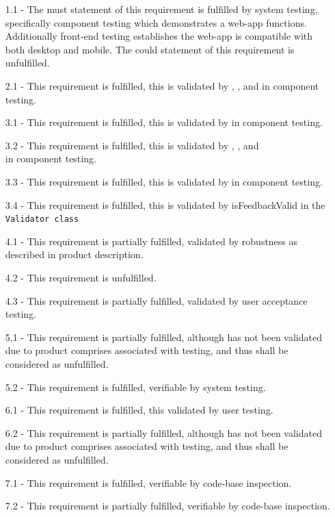 \documentclass[9pt, titlepage]{extarticle}
\begin{document}
\begin{enumerate}[noitemsep, topsep=0pt, leftmargin=9mm]
 \item[1.1 -] The must statement of this requirement is fulfilled by system testing, specifically component testing which demonstrates a web-app functions. Additionally front-end testing establishes the web-app is compatible with both desktop and mobile. The could statement of this requirement is unfulfilled.
  \item[2.1 -] This requirement is fulfilled, this is validated by , , and  in component testing.
   \item[3.1 -] This requirement is fulfilled, this is validated by  in component testing.
 \item[3.2 -] This requirement is fulfilled, this is validated by , , and \\ in component testing.
 \item[3.3 -] This requirement is fulfilled, this is validated by  in component testing.
 \item[3.4 -] This requirement is fulfilled, this is validated by {isFeedbackValid} in the \texttt{Validator class} 
 \item[4.1 -] This requirement is partially fulfilled, validated by robustness as described in product description.
 \item[4.2 -] This requirement is unfulfilled.
 \item[4.3 -] This requirement is partially fulfilled, validated by user acceptance testing.
 \item[5.1 -] This requirement is partially fulfilled, although has not been validated due to product comprises associated with testing, and thus shall be considered as unfulfilled.
 \item[5.2 -] This requirement is fulfilled, verifiable by system testing.
 \item[6.1 -] This requirement is fulfilled, this validated by user testing.
 \item[6.2 -] This requirement is partially fulfilled, although has not been validated due to product comprises associated with testing, and thus shall be considered as unfulfilled.
 \item[7.1 -] This requirement is fulfilled, verifiable by code-base inspection.
 \item[7.2 -] This requirement is partially fulfilled, verifiable by code-base inspection.

\end{enumerate}
\end{document}
